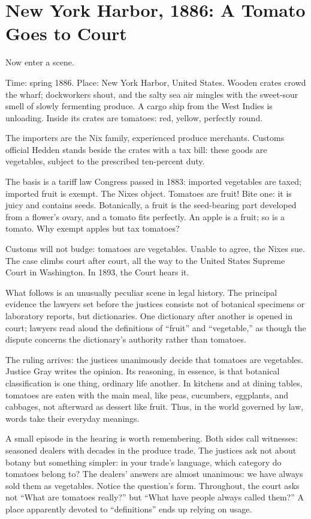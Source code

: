 \section{New York Harbor, 1886: A Tomato Goes to Court}
Now enter a scene.

Time: spring 1886. Place: New York Harbor, United States. Wooden crates crowd the wharf; dockworkers shout, and the salty sea air mingles with the sweet-sour smell of slowly fermenting produce. A cargo ship from the West Indies is unloading. Inside its crates are tomatoes: red, yellow, perfectly round.

The importers are the Nix family, experienced produce merchants. Customs official Hedden stands beside the crates with a tax bill: these goods are vegetables, subject to the prescribed ten-percent duty.

The basis is a tariff law Congress passed in 1883: imported vegetables are taxed; imported fruit is exempt. The Nixes object. Tomatoes are fruit! Bite one: it is juicy and contains seeds. Botanically, a fruit is the seed-bearing part developed from a flower's ovary, and a tomato fits perfectly. An apple is a fruit; so is a tomato. Why exempt apples but tax tomatoes?

Customs will not budge: tomatoes are vegetables. Unable to agree, the Nixes sue. The case climbs court after court, all the way to the United States Supreme Court in Washington. In 1893, the Court hears it.

What follows is an unusually peculiar scene in legal history. The principal evidence the lawyers set before the justices consists not of botanical specimens or laboratory reports, but dictionaries. One dictionary after another is opened in court; lawyers read aloud the definitions of ``fruit'' and ``vegetable,'' as though the dispute concerns the dictionary's authority rather than tomatoes.

The ruling arrives: the justices unanimously decide that tomatoes are vegetables. Justice Gray writes the opinion. Its reasoning, in essence, is that botanical classification is one thing, ordinary life another. In kitchens and at dining tables, tomatoes are eaten with the main meal, like peas, cucumbers, eggplants, and cabbages, not afterward as dessert like fruit. Thus, in the world governed by law, words take their everyday meanings.

A small episode in the hearing is worth remembering. Both sides call witnesses: seasoned dealers with decades in the produce trade. The justices ask not about botany but something simpler: in your trade's language, which category do tomatoes belong to? The dealers' answers are almost unanimous: we have always sold them as vegetables. Notice the question's form. Throughout, the court asks not ``What are tomatoes really?'' but ``What have people always called them?'' A place apparently devoted to ``definitions'' ends up relying on usage.

